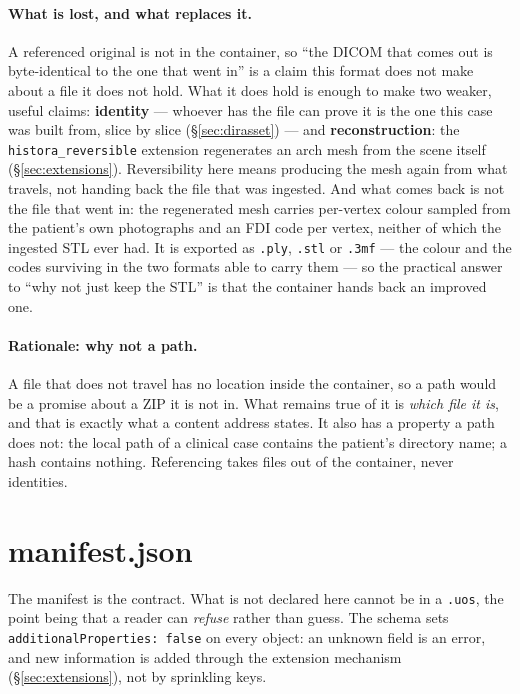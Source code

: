 \documentclass[11pt,a4paper]{article}
\newcommand{\code}[1]{\texttt{\small #1}}
\begin{document}
\paragraph{What is lost, and what replaces it.} A referenced original is not in the
container, so ``the DICOM that comes out is byte-identical to the one that went in'' is a
claim this format does not make about a file it does not hold. What it does hold is enough
to make two weaker, useful claims: \textbf{identity} --- whoever has the file can prove it
is the one this case was built from, slice by slice (\S\ref{sec:dirasset}) --- and
\textbf{reconstruction}: the \code{histora\_reversible} extension regenerates an arch mesh from
the scene itself (\S\ref{sec:extensions}). Reversibility here means producing the mesh
again from what travels, not handing back the file that was ingested. And what comes back is not the file that went in: the regenerated mesh carries per-vertex
colour sampled from the patient's own photographs and an FDI code per vertex, neither of
which the ingested STL ever had. It is exported as \code{.ply}, \code{.stl} or \code{.3mf}
--- the colour and the codes surviving in the two formats able to carry them --- so the
practical answer to ``why not just keep the STL'' is that the container hands back an
improved one.

\paragraph{Rationale: why not a path.} A file that does not travel has no location
inside the container, so a path would be a promise about a ZIP it is not in. What remains
true of it is \emph{which file it is}, and that is exactly what a content address states.
It also has a property a path does not: the local path of a clinical case contains the
patient's directory name; a hash contains nothing. Referencing takes files out of the
container, never identities.

\section{manifest.json}\label{sec:manifest}

The manifest is the contract. What is not declared here cannot be in a \code{.uos}, the
point being that a reader can \emph{refuse} rather than guess. The schema sets
\code{additionalProperties: false} on every object: an unknown field is an error, and new
information is added through the extension mechanism (\S\ref{sec:extensions}), not by
sprinkling keys.
\end{document}
